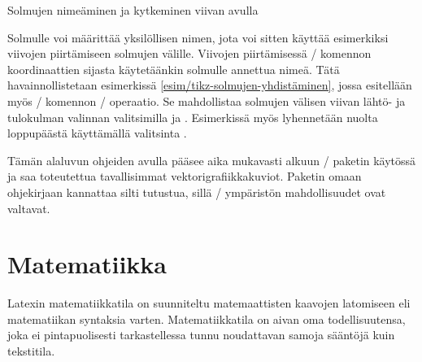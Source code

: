 \begin{esimerkki*}

\begin{koodilohkosis}
\end{koodilohkosis}

  \begin{tulossis}
  \end{tulossis}

  \caption{Solmujen nimeäminen ja kytkeminen viivan avulla}
  \label{esim/tikz-solmujen-yhdistäminen}
\end{esimerkki*}

Solmulle voi määrittää yksilöllisen nimen, jota voi sitten käyttää
esimerkiksi viivojen piirtämiseen solmujen välille. Viivojen
piirtämisessä \-/ komennon koordinaattien sijasta
käytetäänkin solmulle annettua nimeä. Tätä havainnollistetaan
esimerkissä \ref{esim/tikz-solmujen-yhdistäminen}, jossa esitellään myös
\-/ komennon \-/ operaatio. Se mahdollistaa
solmujen välisen viivan lähtö- ja tulokulman valinnan valitsimilla
 ja . Esimerkissä myös lyhennetään nuolta
loppupäästä käyttämällä valitsinta .

Tämän alaluvun ohjeiden avulla pääsee aika mukavasti alkuun
\-/ paketin käytössä ja saa toteutettua tavallisimmat
vektorigrafiikkakuviot. Paketin omaan ohjekirjaan kannattaa silti
tutustua, sillä \-/ ympäristön mahdollisuudet
ovat valtavat.

\section{Matematiikka}
\label{luku/matematiikka}

Latexin matematiikkatila on suunniteltu matemaattisten kaavojen
latomiseen eli matematiikan syntaksia varten. Matematiikkatila on aivan
oma todellisuutensa, joka ei pintapuolisesti tarkastellessa tunnu
noudattavan samoja sääntöjä kuin tekstitila.

